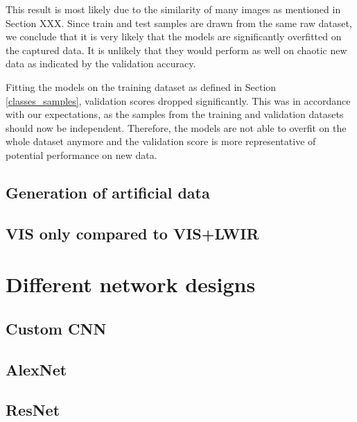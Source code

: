 \documentclass{l4proj}
\begin{document}
This result is most likely due to the similarity of many images as mentioned in Section XXX. Since train and test samples are drawn from the same raw dataset, we conclude that it is very likely that the models are significantly overfitted on the captured data. It is unlikely that they would perform as well on chaotic new data as indicated by the validation accuracy.

Fitting the models on the training dataset as defined in Section \ref{classes_samples}, validation scores dropped significantly. This was in accordance with our expectations, as the samples from the training and validation datasets should now be independent. Therefore, the models are not able to overfit on the whole dataset anymore and the validation score is more representative of potential performance on new data.

\subsection{Generation of artificial data}

\subsection{VIS only compared to VIS+LWIR}


\section{Different network designs}

\subsection{Custom CNN}

\subsection{AlexNet}

\subsection{ResNet}

\end{document}
